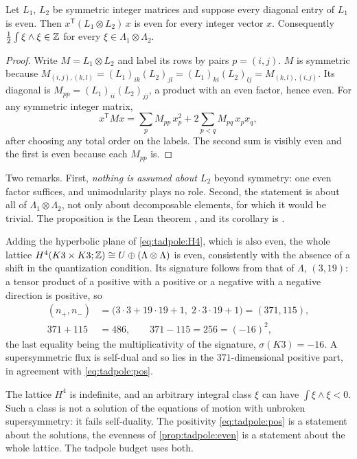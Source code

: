 \begin{proposition}\label{prop:tadpole:even}
Let $L_1$, $L_2$ be symmetric integer matrices and suppose every diagonal entry of $L_1$ is
even. Then $x^{\mathsf T}(L_1\otimes L_2)\,x$ is even for every integer vector $x$. Consequently
$\tfrac12\int\xi\wedge\xi\in\mathbb{Z}$ for every $\xi\in\Lambda_1\otimes\Lambda_2$.
\end{proposition}
\begin{proof}
Write $M=L_1\otimes L_2$ and label its rows by pairs $p=(i,j)$. $M$ is symmetric because
$M_{(i,j),(k,l)}=(L_1)_{ik}(L_2)_{jl}=(L_1)_{ki}(L_2)_{lj}=M_{(k,l),(i,j)}$. Its diagonal is
$M_{pp}=(L_1)_{ii}(L_2)_{jj}$, a product with an even factor, hence even. For any symmetric
integer matrix,
\[
 x^{\mathsf T}Mx=\sum_pM_{pp}\,x_p^2+2\sum_{p<q}M_{pq}\,x_px_q ,
\]
after choosing any total order on the labels. The second sum is visibly even and the first
is even because each $M_{pp}$ is.
\end{proof}
Two remarks. First, \emph{nothing is assumed about $L_2$} beyond symmetry: one even factor
suffices, and unimodularity plays no role. Second, the statement is about all of
$\Lambda_1\otimes\Lambda_2$, not only about decomposable elements, for which it would be
trivial. The proposition is the Lean theorem , and its corollary is
. \TA

Adding the hyperbolic plane of \eqref{eq:tadpole:H4}, which is also even, the whole lattice
$H^4(K3\times K3;\mathbb{Z})\cong U\oplus(\Lambda\otimes\Lambda)$ is even, consistently with the
absence of a shift in the quantization condition. Its signature follows from that of
$\Lambda$, $(3,19)$: a tensor product of a positive with a positive or a negative with a
negative direction is positive, so
\begin{equation}\label{eq:tadpole:sig}
\begin{aligned}
 (n_+,n_-)&=\bigl(3\cdot3+19\cdot19+1,\;2\cdot3\cdot19+1\bigr)=(371,115),\\
 371+115&=486,\qquad 371-115=256=(-16)^2 ,
\end{aligned}
\end{equation}
the last equality being the multiplicativity of the signature, $\sigma(K3)=-16$. A
supersymmetric flux is self-dual and so lies in the $371$-dimensional positive part, in
agreement with \eqref{eq:tadpole:pos}.

\begin{pitfallbox}
The lattice $H^4$ is indefinite, and an arbitrary integral class $\xi$ can have
$\int\xi\wedge\xi<0$. Such a class is not a solution of the equations of motion with
unbroken supersymmetry: it fails self-duality. The positivity \eqref{eq:tadpole:pos} is a
statement about the solutions, the evenness of \cref{prop:tadpole:even} is a statement about
the whole lattice. The tadpole budget uses both.
\end{pitfallbox}

